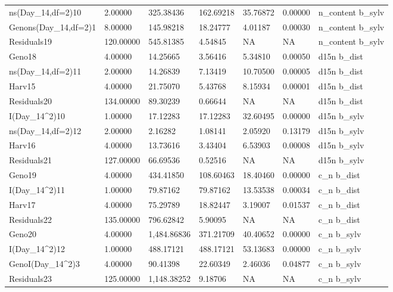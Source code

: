 \documentclass[jou,floatsintext]{apa6}
\begin{document}
\begin{table}[tbp]
\begin{center}
\begin{threeparttable}
{\begin{tabular}{lllllll}
ns(Day\_14,df=2)10 & 2.00000 & 325.38436 & 162.69218 & 35.76872 & 0.00000 & n\_content b\_sylv\\
Genons(Day\_14,df=2)1 & 8.00000 & 145.98218 & 18.24777 & 4.01187 & 0.00030 & n\_content b\_sylv\\
Residuals19 & 120.00000 & 545.81385 & 4.54845 & NA & NA & n\_content b\_sylv\\
Geno18 & 4.00000 & 14.25665 & 3.56416 & 5.34810 & 0.00050 & d15n b\_dist\\
ns(Day\_14,df=2)11 & 2.00000 & 14.26839 & 7.13419 & 10.70500 & 0.00005 & d15n b\_dist\\
Harv15 & 4.00000 & 21.75070 & 5.43768 & 8.15934 & 0.00001 & d15n b\_dist\\
Residuals20 & 134.00000 & 89.30239 & 0.66644 & NA & NA & d15n b\_dist\\
I(Day\_14\textasciicircum{}2)10 & 1.00000 & 17.12283 & 17.12283 & 32.60495 & 0.00000 & d15n b\_sylv\\
ns(Day\_14,df=2)12 & 2.00000 & 2.16282 & 1.08141 & 2.05920 & 0.13179 & d15n b\_sylv\\
Harv16 & 4.00000 & 13.73616 & 3.43404 & 6.53903 & 0.00008 & d15n b\_sylv\\
Residuals21 & 127.00000 & 66.69536 & 0.52516 & NA & NA & d15n b\_sylv\\
Geno19 & 4.00000 & 434.41850 & 108.60463 & 18.40460 & 0.00000 & c\_n b\_dist\\
I(Day\_14\textasciicircum{}2)11 & 1.00000 & 79.87162 & 79.87162 & 13.53538 & 0.00034 & c\_n b\_dist\\
Harv17 & 4.00000 & 75.29789 & 18.82447 & 3.19007 & 0.01537 & c\_n b\_dist\\
Residuals22 & 135.00000 & 796.62842 & 5.90095 & NA & NA & c\_n b\_dist\\
Geno20 & 4.00000 & 1,484.86836 & 371.21709 & 40.40652 & 0.00000 & c\_n b\_sylv\\
I(Day\_14\textasciicircum{}2)12 & 1.00000 & 488.17121 & 488.17121 & 53.13683 & 0.00000 & c\_n b\_sylv\\
GenoI(Day\_14\textasciicircum{}2)3 & 4.00000 & 90.41398 & 22.60349 & 2.46036 & 0.04877 & c\_n b\_sylv\\
Residuals23 & 125.00000 & 1,148.38252 & 9.18706 & NA & NA & c\_n b\_sylv\\
\bottomrule
\end{tabular}
}
\end{threeparttable}
\end{center}
\end{table}
\end{document}
